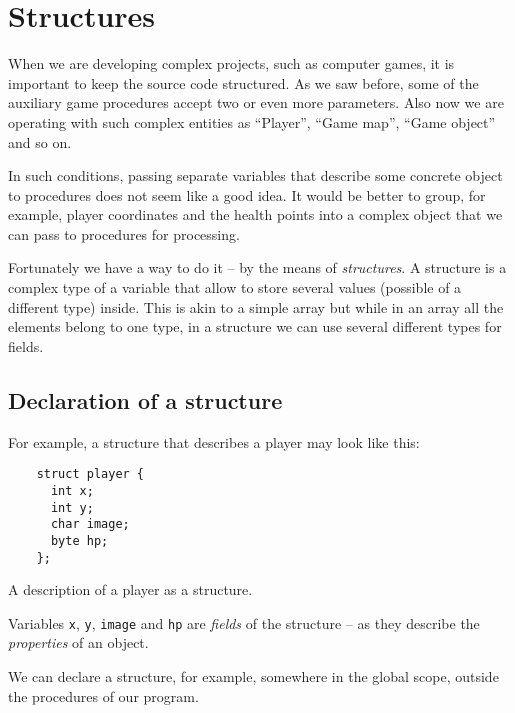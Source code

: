 \documentclass[../sparc.tex]{subfiles}
\begin{document}
\section{Structures}

When we are developing complex projects, such as computer games, it is important
to keep the source code structured.  As we saw before, some of the auxiliary
game procedures accept two or even more parameters.  Also now we are operating
with such complex entities as ``Player'', ``Game map'', ``Game object'' and so
on.

In such conditions, passing separate variables that describe some concrete
object to procedures does not seem like a good idea.  It would be better to
group, for example, player coordinates and the health points into a complex
object that we can pass to procedures for processing.

Fortunately we have a way to do it -- by the means of \emph{structures}.  A
structure is a complex type of a variable that allow to store several values
(possible of a different type) inside.  This is akin to a simple array but while
in an array all the elements belong to one type, in a structure we can use
several different types for fields.

\subsection{Declaration of a structure}

For example, a structure that describes a player may look like this:

\begin{listing}[H]
  \begin{verbatim}
    struct player {
      int x;
      int y;
      char image;
      byte hp;
    };
  \end{verbatim}
  \caption{A description of a player as a structure.}
  \label{listing:game-dev-structure}
\end{listing}

Variables \texttt{x}, \texttt{y}, \texttt{image} and
\texttt{hp} are \emph{fields} of the structure -- as they describe the
\emph{properties} of an object.

We can declare a structure, for example, somewhere in the global scope, outside
the procedures of our program.
\end{document}
